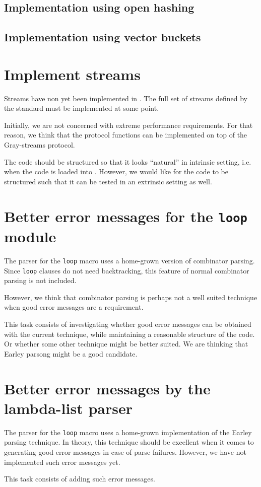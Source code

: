 \subsection{Implementation using open hashing}

\subsection{Implementation using vector buckets}

\section{Implement streams}

Streams have non yet been implemented in \sysname{}.  The full set of
streams defined by the standard must be implemented at some point.

Initially, we are not concerned with extreme performance
requirements.  For that reason, we think that the protocol functions
can be implemented on top of the Gray-streams protocol.

The code should be structured so that it looks ``natural'' in
intrinsic setting, i.e. when the code is loaded into \sysname{}.
However, we would like for the code to be structured such that it can
be tested in an extrinsic setting as well.

\section{Better error messages for the \texttt{loop} module}

The parser for the \texttt{loop} macro uses a home-grown version of
combinator parsing.  Since \texttt{loop} clauses do not need
backtracking, this feature of normal combinator parsing is not
included.

However, we think that combinator parsing is perhaps not a well suited
technique when good error messages are a requirement.

This task consists of investigating whether good error messages can be
obtained with the current technique, while maintaining a reasonable
structure of the code.  Or whether some other technique might be
better suited.  We are thinking that Earley parsong might be a good
candidate.

\section{Better error messages by the lambda-list parser}

The parser for the \texttt{loop} macro uses a home-grown
implementation of the Earley parsing technique.  In theory, this
technique should be excellent when it comes to generating good error
messages in case of parse failures.  However, we have not implemented
such error messages yet.

This task consists of adding such error messages.
